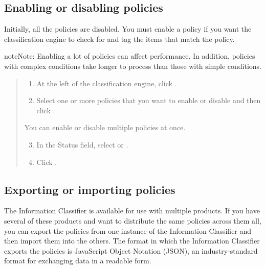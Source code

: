 \documentclass[letterpaper,10pt,english]{sphinxmanual}
\begin{document}
\subsection{Enabling or disabling policies}
\label{\detokenize{mcdmp_app_ug:enabling-or-disabling-policies}}
Initially, all the policies are disabled. You must enable a policy if you want the classification engine to check for and tag the items that match the policy.

\begin{sphinxadmonition}{note}{Note:}
Enabling a lot of policies can affect performance. In addition, policies with complex conditions take longer to process than those with simple conditions.
\end{sphinxadmonition}

\begin{quote}
\begin{enumerate}
\item {} 
At the left of the classification engine, click .

\item {} 
Select one or more policies that you want to enable or disable and then click .

\end{enumerate}

You can enable or disable multiple policies at once.
\begin{enumerate}
\setcounter{enumi}{2}
\item {} 
In the Status field, select  or .

\item {} 
Click .

\end{enumerate}
\end{quote}


\subsection{Exporting or importing policies}
\label{\detokenize{mcdmp_app_ug:exporting-or-importing-policies}}
The Information Classifier is available for use with multiple products. If you have several of these products and want to distribute the same policies across them all, you can export the policies from one instance of the Information Classifier and then import them into the others. The format in which the Information Classifier exports the policies is JavaScript Object Notation (JSON), an industry-standard format for exchanging data in a readable form.
\end{document}
